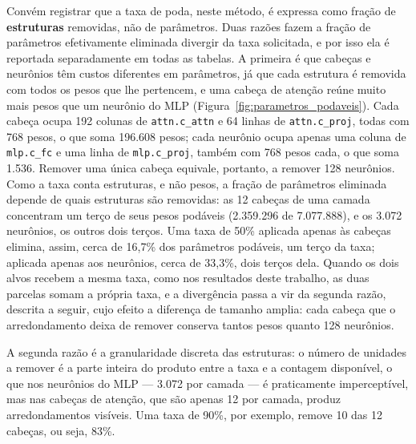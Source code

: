 Convém registrar que a taxa de poda, neste método, é expressa como fração de
\textbf{estruturas} removidas, não de parâmetros. Duas razões fazem a fração de parâmetros
efetivamente eliminada divergir da taxa solicitada, e por isso ela é reportada
separadamente em todas as tabelas. A primeira é que cabeças e neurônios têm custos
diferentes em parâmetros, já que cada estrutura é removida com todos os pesos que lhe
pertencem, e uma cabeça de atenção reúne muito mais pesos que um neurônio do MLP
(Figura~\ref{fig:parametros_podaveis}). Cada cabeça ocupa 192 colunas de
\texttt{attn.c\_attn} e 64 linhas de \texttt{attn.c\_proj}, todas com 768 pesos, o que
soma 196.608 pesos; cada neurônio ocupa apenas uma coluna de \texttt{mlp.c\_fc} e uma linha
de \texttt{mlp.c\_proj}, também com 768 pesos cada, o que soma 1.536. Remover uma única
cabeça equivale, portanto, a remover 128 neurônios. Como a taxa conta
estruturas, e não pesos, a fração de parâmetros eliminada depende de quais estruturas são
removidas: as 12 cabeças de uma camada concentram um terço de seus pesos podáveis
(2.359.296 de 7.077.888), e os 3.072 neurônios, os outros dois terços. Uma taxa de 50\%
aplicada apenas às cabeças elimina, assim, cerca de 16,7\% dos parâmetros podáveis, um
terço da taxa; aplicada apenas aos neurônios, cerca de 33,3\%, dois terços dela. Quando os
dois alvos recebem a mesma taxa, como nos resultados deste trabalho, as
duas parcelas somam a própria taxa, e a divergência passa a vir da segunda razão, descrita
a seguir, cujo efeito a diferença de tamanho amplia: cada cabeça que o arredondamento
deixa de remover conserva tantos pesos quanto 128 neurônios.

A segunda razão é a granularidade discreta das estruturas: o número de
unidades a remover é a parte inteira do produto entre a taxa e a contagem disponível, o que
nos neurônios do MLP --- 3.072 por camada --- é praticamente imperceptível, mas nas cabeças
de atenção, que são apenas 12 por camada, produz arredondamentos visíveis. Uma taxa de
90\%, por exemplo, remove 10 das 12 cabeças, ou seja, 83\%.

